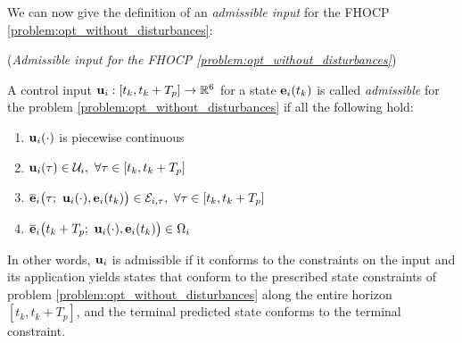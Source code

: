 We can now give the definition of an \textit{admissible input} for the FHOCP
\eqref{problem:opt_without_disturbances}:\\[1ex]

\begin{bw_box}
  \begin{definition} (\textit{Admissible input for the FHOCP
\eqref{problem:opt_without_disturbances}})
  \label{definition:admissible_input}

  A control input $\bm{\mathbf{u}}_i : [t_k, t_k + T_p] \to \mathbb{R}^6$ for a state
  $\bm{\mathbf{e}}_i(t_k)$ is called \textit{admissible} for the problem
  \eqref{problem:opt_without_disturbances} if all the following hold:

  \begin{enumerate}
    \item $\bm{\mathbf{u}}_i(\cdot)$ is piecewise continuous
    \item $\vect{u}_i(\tau) \in \mathcal{U}_i,\ \forall \tau \in [t_k, t_k + T_p]$
    \item $\overline{\vect{e}}_i\big(\tau;\ \vect{u}_i(\cdot), \vect{e}_i(t_k)\big) \in \mathcal{E}_{i,\tau},\ \forall \tau \in [t_k, t_k + T_p]$
    \item $\overline{\vect{e}}_i\big(t_k + T_p;\ \vect{u}_i(\cdot), \vect{e}_i(t_k)\big) \in \Omega_i$
  \end{enumerate}

  In other words, $\bm{\mathbf{u}}_i$ is admissible if it conforms to the constraints
  on the input and its application yields states that conform to the
  prescribed state constraints of problem
  \eqref{problem:opt_without_disturbances} along the entire horizon
  $[t_k, t_k + T_p]$, and the terminal predicted state conforms to the
  terminal constraint.

\end{definition}
\end{bw_box}
